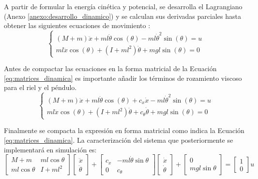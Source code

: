 \documentclass[11pt,fleqn]{book} %
\begin{document}
A partir de formular la energía cinética y potencial, se desarrolla el Lagrangiano (Anexo \ref{anexo:desarrollo_dinamico}) y se calculan sus derivadas parciales hasta obtener las siguientes ecuaciones de movimiento \cite{tedrake2023}:
\begin{equation}
	\begin{cases}
		(M + m)\ddot{x} + ml\ddot{\theta}\cos(\theta) - ml\dot{\theta}^2\sin(\theta) = u \\
		ml\ddot{x}\cos(\theta) + (I + ml^2)\ddot{\theta} + mgl\sin(\theta) = 0
	\end{cases}\label{eq:ec_movimiento}
\end{equation}

Antes de compactar las ecuaciones en la forma matricial de la Ecuación \ref{eq:matrices_dinamica} es importante añadir los términos de rozamiento viscoso para el riel y el péndulo.  
\begin{equation}
	\begin{cases}
		(M + m)\ddot{x} + ml\ddot{\theta}\cos(\theta) + c_x\dot{x} - ml\dot{\theta}^2\sin(\theta) = u \\
		ml\ddot{x}\cos(\theta) + (I + ml^2)\ddot{\theta} + c_{\theta}\dot{\theta} + mgl\sin(\theta) = 0
	\end{cases}\label{eq:ec_movimiento_final}
\end{equation}

Finalmente se compacta la expresión en forma matricial como indica la Ecuación \ref{eq:matrices_dinamica}. La caracterización del sistema que posteriormente se implementará en simulación es: 
\begin{equation}
	\begin{bmatrix} 
		M + m & m l \cos\theta \\ 
		m l \cos\theta & I + m l^2 
	\end{bmatrix} 
	\begin{bmatrix} 
		\ddot{x} \\ 
		\ddot{\theta} 
	\end{bmatrix} 
	+ 
	\begin{bmatrix} 
		c_x & -m l \dot{\theta} \sin\theta \\ 
		0 & c_\theta 
	\end{bmatrix} 
	\begin{bmatrix} 
		\dot{x} \\ 
		\dot{\theta} 
	\end{bmatrix} 
	+ 
	\begin{bmatrix} 
		0 \\ 
		m g l \sin\theta 
	\end{bmatrix} 
	= 
	\begin{bmatrix} 
		1 \\ 
		0 
	\end{bmatrix} u
	\label{eq:matrices_dinamica_desarrollada}
\end{equation}
\end{document}
